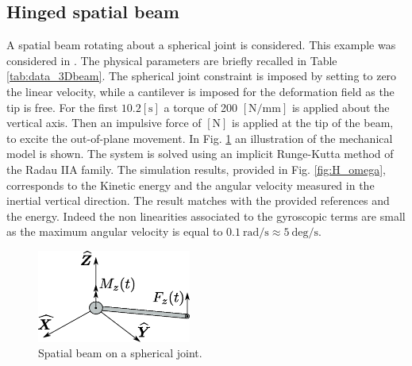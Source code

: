 \documentclass{svjour3}                     %
\begin{document}
\subsection{Hinged spatial beam}
A spatial beam rotating about a spherical joint is considered. This example was considered in \cite{Cardona2000,Ellenbroek2018}. The physical parameters are briefly recalled in Table \ref{tab:data_3Dbeam}. The spherical joint constraint is imposed by setting to zero the linear velocity, while a cantilever is imposed for the deformation field as the tip is free. For the first $10.2 [\mathrm{s}]$ a torque of 200 $[\mathrm{N/mm}]$ is applied about the vertical axis. Then an impulsive force of $[\mathrm{N}]$ is applied at the tip of the beam, to excite the out-of-plane movement. In Fig. \ref{fig:beam_3D} an illustration of the mechanical model is shown. The system is solved using an implicit Runge-Kutta method of the Radau IIA family. The simulation results, provided in Fig. \ref{fig:H_omega}, corresponds to the Kinetic energy and the angular velocity measured in the inertial vertical direction. The result matches with the provided references and the energy. Indeed the non linearities associated to the gyroscopic terms are small as the maximum angular velocity is equal to $0.1 \ \mathrm{rad/s} \approx 5 \ \mathrm{deg/s}$. 

\begin{figure}[tb]
	\centering
	\includegraphics[width=0.45\textwidth]{rotbeam_3D.eps} 
	\caption{Spatial beam on a spherical joint.}
	\label{fig:beam_3D}
\end{figure}
\end{document}
